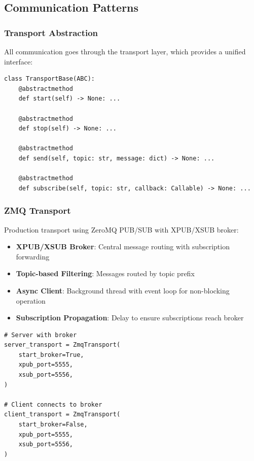 \subsection{Communication Patterns}

\subsubsection{Transport Abstraction}

All communication goes through the transport layer, which provides a unified interface:

\begin{verbatim}
class TransportBase(ABC):
    @abstractmethod
    def start(self) -> None: ...

    @abstractmethod
    def stop(self) -> None: ...

    @abstractmethod
    def send(self, topic: str, message: dict) -> None: ...

    @abstractmethod
    def subscribe(self, topic: str, callback: Callable) -> None: ...
\end{verbatim}

\subsubsection{ZMQ Transport}

Production transport using ZeroMQ PUB/SUB with XPUB/XSUB broker:

\begin{itemize}
   \item \textbf{XPUB/XSUB Broker}: Central message routing with subscription forwarding
   \item \textbf{Topic-based Filtering}: Messages routed by topic prefix
   \item \textbf{Async Client}: Background thread with event loop for non-blocking operation
   \item \textbf{Subscription Propagation}: Delay to ensure subscriptions reach broker
\end{itemize}

\begin{verbatim}
# Server with broker
server_transport = ZmqTransport(
    start_broker=True,
    xpub_port=5555,
    xsub_port=5556,
)

# Client connects to broker
client_transport = ZmqTransport(
    start_broker=False,
    xpub_port=5555,
    xsub_port=5556,
)
\end{verbatim}

